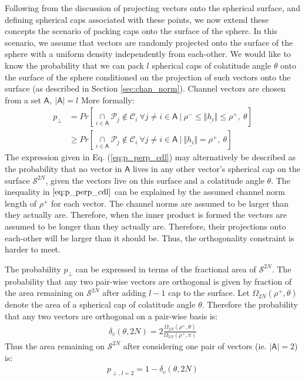 Following from the discussion of projecting vectors onto the spherical surface, and defining spherical caps associated with these points, we now extend these concepts the scenario of packing caps onto the surface of the sphere. In this scenario, we assume that vectors are randomly projected onto the surface of the sphere with a uniform density independently from each-other. We would like to know the probability that we can pack $l$ spherical caps of colatitude angle $\theta$ onto the surface of the sphere conditioned on the projection of such vectors onto the surface (as described in Section \ref{sec:chan_norm}). Channel vectors are chosen from a set $\mathsf{A},\ \vert \mathsf{A}\vert = l$ More formally:
\begin{equation}\label{eq:p_perp_cdl}
    \begin{aligned}
        p_\perp &= Pr[\underset{i \in\mathsf{A}}{\cap} \mathcal{P}_j\not\in\mathcal{C}_i\ \forall j\neq i\in\mathsf{A}\ \vert\ \rho^-\leq  \Vert \underline{h_i} \Vert \leq \rho^+,\ \theta ]\\
        &\geq Pr[\underset{i \in\mathsf{A}}{\cap} \mathcal{P}_j\not\in\mathcal{C}_i\ \forall j\neq i\in\mathsf{A}\ \vert\ \Vert \underline{h_i} \Vert = \rho^+,\ \theta ]
    \end{aligned}
\end{equation}
The expression given in Eq. (\ref{eq:p_perp_cdl}) may alternatively be described as the probability that no vector in $\mathsf{A}$ lives in any other vector's spherical cap on the surface $\mathcal{S}^{2N}$, given the vectors live on this surface and a colatitude angle $\theta$. The inequality in $\ref{eq:p_perp_cdl}$ can be explained by the assumed channel norm length of $\rho^+$ for each vector. The channel norms are assumed to be larger than they actually are. Therefore, when the inner product is formed the vectors are assumed to be longer than they actually are. Therefore, their projections onto each-other will be larger than it should be. Thus, the orthogonality constraint is harder to meet.

The probability $p_\perp$ can be expressed in terms of the fractional area of $\mathcal{S}^{2N}$. The probability that any two pair-wise vectors are orthogonal is given by fraction of the area remaining on $\mathcal{S}^{2N}$ after adding $l-1$ cap to the surface. Let $\Omega_{2N}(\rho^+,\theta)$ denote the area of a spherical cap of colatitude angle $\theta$. Therefore the probability that any two vectors are orthogonal on a pair-wise basis is:
\begin{equation}\label{eq:delta_c}
    \begin{aligned}
        \delta_c(\theta,2N) = 2\frac{\Omega_{2N}(\rho^+,\theta)}{\Omega_{2N}(\rho^+,\pi)}
    \end{aligned}
\end{equation}
Thus the area remaining on $\mathcal{S}^{2N}$ after considering one pair of vectors (ie. $\vert \mathsf{A} \vert = 2$) is:
\begin{equation}\label{eq:p_perp_l2}
    \begin{aligned}
        p_{\perp,l=2} = 1-\delta_c(\theta,2N)
    \end{aligned}
\end{equation}

